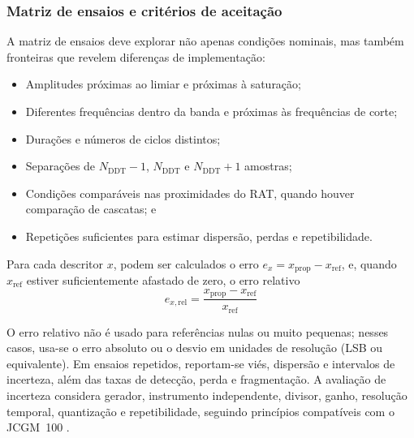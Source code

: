 \subsubsection{Matriz de ensaios e critérios de aceitação}
A matriz de ensaios deve explorar não apenas condições nominais, mas também fronteiras que revelem diferenças de implementação:

\begin{itemize}
	\item Amplitudes próximas ao limiar e próximas à saturação;
	
	\item Diferentes frequências dentro da banda e próximas às frequências de corte;
	
	\item Durações e números de ciclos distintos; 
	
	\item Separações de \(N_{\mathrm{DDT}}-1\), \(N_{\mathrm{DDT}}\) e \(N_{\mathrm{DDT}}+1\) amostras;
	
	\item Condições comparáveis nas proximidades do RAT, quando houver comparação de cascatas; e
	
	\item Repetições suficientes para estimar dispersão, perdas e repetibilidade.
\end{itemize}

Para cada descritor \(x\), podem ser calculados o erro \(e_x = x_{\mathrm{prop}} - x_{\mathrm{ref}}\), e, quando \(x_{\mathrm{ref}}\) estiver suficientemente afastado de zero, o erro relativo
\begin{equation}
	e_{x,\mathrm{rel}} = \frac{x_{\mathrm{prop}}-x_{\mathrm{ref}}}{x_{\mathrm{ref}}}
	\label{v2:eq:erro_relativo_descritor}
\end{equation}

O erro relativo não é usado para referências nulas ou muito pequenas; nesses casos, usa-se o erro absoluto ou o desvio em unidades de resolução (LSB ou equivalente). Em ensaios repetidos, reportam-se viés, dispersão e intervalos de incerteza, além das taxas de detecção, perda e fragmentação. A avaliação de incerteza considera gerador, instrumento independente, divisor, ganho, resolução temporal, quantização e repetibilidade, seguindo princípios compatíveis com o JCGM~100 \cite{jcgm2008}.

